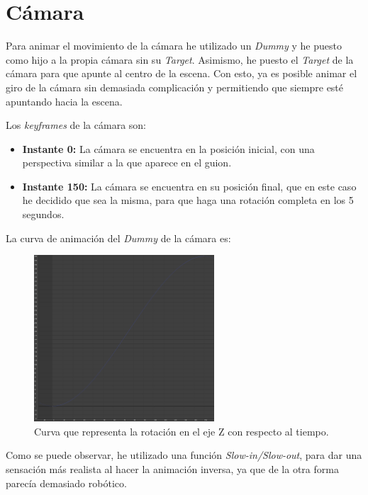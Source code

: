 \section{Cámara}
Para animar el movimiento de la cámara he utilizado un \textit{Dummy} y he puesto como hijo a la propia cámara sin su \textit{Target}. Asimismo, he puesto el \textit{Target} de la cámara para que apunte al centro de la escena. Con esto, ya es posible animar el giro de la cámara sin demasiada complicación y permitiendo que siempre esté apuntando hacia la escena.

\bigskip

Los \textit{keyframes} de la cámara son:

\begin{itemize}
   \item \textbf{Instante 0: }La cámara se encuentra en la posición inicial, con una perspectiva similar a la que aparece en el guion.
   \item \textbf{Instante 150: }La cámara se encuentra en su posición final, que en este caso he decidido que sea la misma, para que haga una rotación completa en los 5 segundos.
\end{itemize}

\bigskip

La curva de animación del \textit{Dummy} de la cámara es:

\begin{figure}[H]
   \centering
   \includegraphics[width=0.6\textwidth]{imagenes/curvas/Camara/blue.png}
   \caption{Curva que representa la rotación en el eje Z con respecto al tiempo.}
\end{figure}

Como se puede observar, he utilizado una función \textit{Slow-in/Slow-out}, para dar una sensación más realista al hacer la animación inversa, ya que de la otra forma parecía demasiado robótico.

